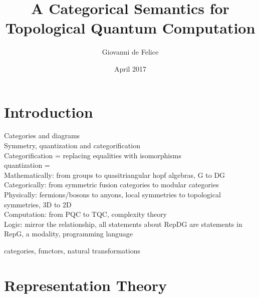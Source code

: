 \documentclass{article}
\title{A Categorical Semantics for Topological Quantum Computation}
\author{Giovanni de Felice}
\date{April 2017}
\newenvironment{definition}[1][Definition]{\begin{trivlist}
\item[\hskip \labelsep {\bfseries #1}]}{\end{trivlist}}
\begin{document}
\maketitle
\tableofcontents

\pagebreak
\section{Introduction}
Categories and diagrams \\
Symmetry, quantization and categorification\\
Categorification = replacing equalities with isomorphisms\\
quantization =\\
Mathematically: from groups to quasitriangular hopf algebras, G to DG\\
Categorically: from symmetric fusion categories to modular categories\\
Physically: fermions/bosons to anyons, local symmetries to topological symmetries, 3D to 2D\\
Computation: from PQC to TQC, complexity theory\\
Logic: mirror the relationship, all statements about RepDG are statements in RepG, a modality, programming language
\begin{definition}
categories, functors, natural transformations
\end{definition}
\section{Representation Theory}
\end{document}
